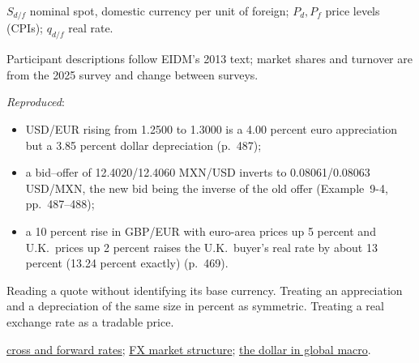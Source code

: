 \begin{qfdefinition}
 $S_{d/f}$ nominal spot, domestic currency per unit of foreign; $P_d,P_f$ price levels (CPIs); $q_{d/f}$ real rate.

 Participant descriptions follow EIDM's 2013 text; market shares and turnover are from the 2025 survey and change between surveys.

 \emph{Reproduced}:
\begin{itemize}
\item USD/EUR rising from 1.2500 to 1.3000 is a 4.00 percent euro appreciation but a 3.85 percent dollar depreciation (p.~487);
\item a bid--offer of 12.4020/12.4060 MXN/USD inverts to 0.08061/0.08063 USD/MXN, the new bid being the inverse of the old offer (Example~9-4, pp.~487--488);
\item a 10 percent rise in GBP/EUR with euro-area prices up 5 percent and U.K.\ prices up 2 percent raises the U.K.\ buyer's real rate by about 13 percent (13.24 percent exactly) (p.~469).
\end{itemize}

 Reading a quote without identifying its base currency. Treating an appreciation and a depreciation of the same size in percent as symmetric. Treating a real exchange rate as a tradable price.

 \hyperref[meth:cross-forward-rates]{cross and forward rates}; \hyperref[def:fx-market-structure]{FX market structure}; \hyperref[def:us-dollar-dxy-sdr]{the dollar in global macro}.

\end{qfdefinition}
